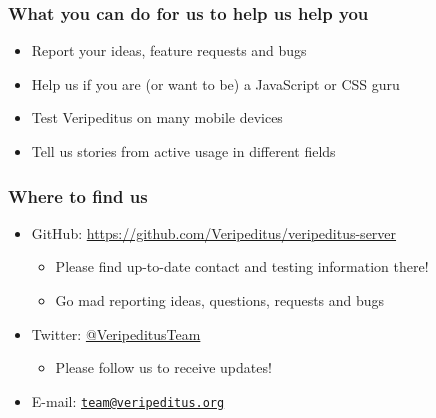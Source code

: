 \documentclass[aspectratio=43]{beamer}
\begin{document}
{ 

 \begin{frame}
  \frametitle{What you can do for us to help us help you}

  \begin{itemize}
   \item{Report your ideas, feature requests and bugs}
   \item{Help us if you are (or want to be) a JavaScript or CSS guru}
   \item{Test Veripeditus on many mobile devices}
   \item{Tell us stories from active usage in different fields}
  \end{itemize}
 \end{frame}


 \begin{frame}
  \frametitle{Where to find us}

  \begin{itemize}
   \item{GitHub: \url{https://github.com/Veripeditus/veripeditus-server}
    \begin{itemize}
     \item{Please find up-to-date contact and testing information there!}
     \item{Go mad reporting ideas, questions, requests and bugs}
    \end{itemize}
   }
   \item{Twitter: \href{https://www.twitter.com/VeripeditusTeam}{@VeripeditusTeam}
    \begin{itemize}
     \item{Please follow us to receive updates!}
    \end{itemize}
   }
   \item{E-mail: \href{mailto:team@veripeditus.org}{\nolinkurl{team@veripeditus.org}} }
  \end{itemize}
 \end{frame}

}
\end{document}
